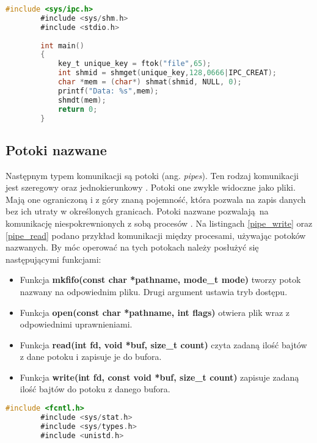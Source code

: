 {{        \begin{lstlisting}[caption=Przykładowa implementacja procesu odczytującego dane z pamięci \\ współdzielonej w języku C, language=C, label=mem_read]
        #include <sys/ipc.h>
        #include <sys/shm.h>
        #include <stdio.h>
          
        int main()
        {
            key_t unique_key = ftok("file",65);
            int shmid = shmget(unique_key,128,0666|IPC_CREAT);
            char *mem = (char*) shmat(shmid, NULL, 0);
            printf("Data: %s",mem);
            shmdt(mem);
            return 0;
        }
        \end{lstlisting}
    }
    \subsection{Potoki nazwane}
    {
        Następnym typem komunikacji są potoki (ang. \textit{pipes}). Ten rodzaj komunikacji jest szeregowy oraz jednokierunkowy \cite{com_distr}. Potoki one zwykle widoczne jako pliki. Mają one ograniczoną i z góry znaną pojemność, która pozwala na zapis danych bez ich utraty w określonych granicach. Potoki nazwane pozwalają na komunikację niespokrewnionych z sobą procesów \cite{named_pipes}. Na listingach \ref{pipe_write} oraz \ref{pipe_read} podano przykład komunikacji między procesami, używając potoków nazwanych. By móc operować na tych potokach należy posłużyć się następującymi funkcjami:
        
        \begin{itemize}
            \item Funkcja \textbf{mkfifo(const char *pathname, mode\_t mode)} tworzy potok nazwany na odpowiednim pliku. Drugi argument ustawia tryb dostępu.
            \item Funkcja \textbf{open(const char *pathname, int flags)} otwiera plik wraz z odpowiednimi uprawnieniami.
            \item Funkcja \textbf{read(int fd, void *buf, size\_t count)} czyta zadaną ilość bajtów z dane potoku i zapisuje je do bufora.
            \nopagebreak
            \item Funkcja \textbf{write(int fd, const void *buf, size\_t count)} zapisuje zadaną ilość bajtów do potoku z danego bufora.
        \end{itemize}

        \begin{lstlisting}[caption=Przykładowa implementacja procesu zapisującego dane do potoku nazwanego w języku~C, language=C, label=pipe_write]
        #include <fcntl.h>
        #include <sys/stat.h>
        #include <sys/types.h>
        #include <unistd.h>
        

\end{lstlisting}}}
